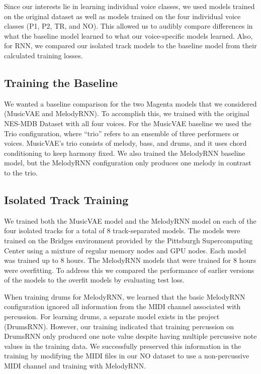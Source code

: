\documentclass{article}
\begin{document}

Since our interests lie in learning individual voice classes, we used models trained on the original dataset as well as models trained on the four individual voice classes (P1, P2, TR, and NO). This allowed us to audibly compare differences in what the baseline model learned to what our voice-specific models learned. Also, for RNN, we compared our isolated track models to the baseline model from their calculated training losses.

\subsection{Training the Baseline}
We wanted a baseline comparison for the two Magenta models that we considered (MusicVAE and MelodyRNN). To accomplish this, we trained with the original NES-MDB Dataset with all four voices. For the MusicVAE baseline we used the Trio configuration, where “trio” refers to an ensemble of three performers or voices. MusicVAE’s trio consists of melody, bass, and drums, and it uses chord conditioning to keep harmony fixed. We also trained the MelodyRNN baseline model, but the MelodyRNN configuration only produces one melody in contrast to the trio.

\subsection{Isolated Track Training}
We trained both the MusicVAE model and the MelodyRNN model on each of the four isolated tracks for a total of 8 track-separated models. The models were trained on the Bridges environment provided by the Pittsburgh Supercomputing Center using a mixture of regular memory nodes and GPU nodes. Each model was trained up to 8 hours. The MelodyRNN models that were trained for 8 hours were overfitting. To address this we compared the performance of earlier versions of the models to the overfit models by evaluating test loss.

When training drums for MelodyRNN, we learned that the basic MelodyRNN configuration ignored all information from the MIDI channel associated with percussion. For learning drums, a separate model exists in the project (DrumsRNN). However, our training indicated that training percussion on DrumsRNN only produced one note value despite having multiple percussive note values in the training data. We successfully preserved this information in the training by modifying the MIDI files in our NO dataset to use a non-percussive MIDI channel and training with MelodyRNN.
\end{document}

